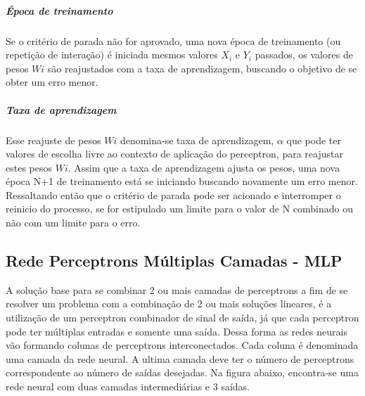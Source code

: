 \documentclass[	12pt, Times, openright, twoside, a4paper, english, brazil]{abntex2}
\begin{document}
            \subparagraph*{Época de treinamento}
            	Se o critério de parada não for aprovado, uma nova época de treinamento (ou repetição de interação) é iniciada mesmos valores $X_i$ e $Y_i$ passados, os valores de pesos $Wi$ são reajustados com a taxa de aprendizagem, buscando o objetivo de se obter um erro menor.
            	
            \subparagraph {Taxa de aprendizagem}
            	Esse reajuste de pesos $Wi$ denomina-se taxa de aprendizagem, $\alpha$ que pode ter valores de escolha livre ao contexto de aplicação do perceptron, para reajustar estes pesos $Wi$. Assim que a taxa de aprendizagem ajusta os pesos, uma nova época N+1 de treinamento está se iniciando buscando novamente um erro menor. Ressaltando então que o critério de parada pode ser acionado e interromper o reinicio do processo, se for estipulado um limite para o valor de N combinado ou não com um limite para o erro. 
            	
  	    \subsection{Rede Perceptrons Múltiplas Camadas - MLP}
  	       
  	       A solução base para se combinar 2 ou mais camadas de perceptrons a fim de se resolver um problema com a combinação de 2 ou mais soluções lineares, é a utilização de um perceptron combinador de sinal de saída, já que cada perceptron pode ter múltiplas entradas e somente uma saída. Dessa forma as redes neurais vão formando colunas de perceptrons interconectados. Cada coluna é denominada uma camada da rede neural. A ultima camada deve ter o número de perceptrons correspondente ao número de saídas desejadas. Na figura abaixo, encontra-se uma rede neural com duas camadas intermediárias e 3 saídas.
  	       
  	       \begin{figure}[H]
  	       \end{figure}
         
\end{document}
